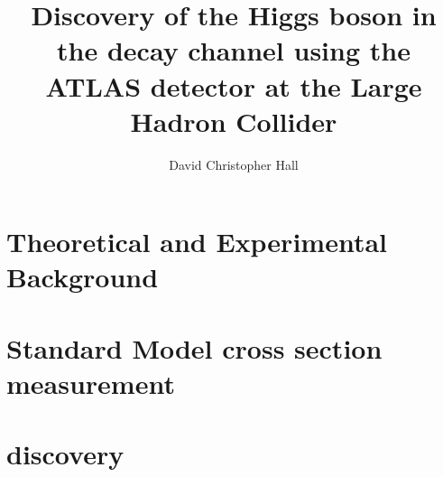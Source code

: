 \documentclass[hyper, linkcolor=blue]{mythesis}
\title{Discovery of the Higgs boson in the \WW decay channel using the ATLAS detector at the Large Hadron Collider}
\author{David Christopher Hall}
\begin{document}
\begin{frontmatter}
  
\end{frontmatter}

\begin{mainmatter}
  \listoftodos
  
  \part{Theoretical and Experimental Background}
    
    
    

  \part{Standard Model \WW cross section measurement}

  \part{\HWW discovery}
    
    
    

\end{mainmatter}

\begin{appendices}

\end{appendices}

\begin{backmatter}
  
  
  \listoffigures
  \listoftables
\end{backmatter}
\end{document}
